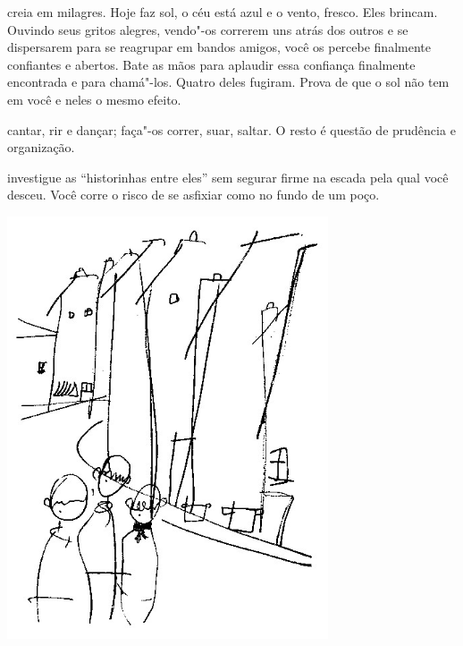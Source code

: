 \bigskip
\bigskip

 creia em milagres. Hoje faz sol, o céu está azul e o vento, fresco.
Eles brincam. Ouvindo seus gritos alegres, vendo"-os correrem uns atrás
dos outros e se dispersarem para se reagrupar em bandos amigos, você os
percebe finalmente confiantes e abertos. Bate as mãos para aplaudir essa
confiança finalmente encontrada e para chamá"-los. Quatro deles fugiram.
Prova de que o sol não tem em você e neles o mesmo efeito.

\bigskip
\bigskip

 cantar, rir e dançar; faça"-os correr, suar, saltar. O resto é
questão de prudência e organização.

\bigskip
\bigskip

 investigue as ``historinhas entre eles'' sem segurar firme na escada
pela qual você desceu. Você corre o risco de se asfixiar como no fundo
de um poço.

\bigskip
\bigskip

\pagebreak
\thispagestyle{empty}

\begin{vplace}[.50]
\begin{center}
\includegraphics[width=95mm]{./imgs/Image_9.jpg}
\end{center}
\end{vplace}

